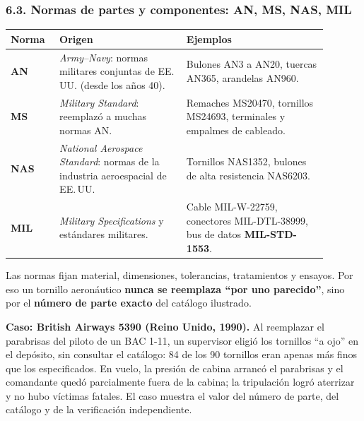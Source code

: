 \subsubsection*{6.3. Normas de partes y componentes: AN, MS, NAS, MIL}
\begin{center}
\small
\begin{tabular}{|p{0.13\linewidth}|p{0.36\linewidth}|p{0.40\linewidth}|}
\hline
\textbf{Norma} & \textbf{Origen} & \textbf{Ejemplos} \\ \hline
\textbf{AN} & \textit{Army--Navy}: normas militares conjuntas de EE.\,UU. (desde los años 40). &
Bulones AN3 a AN20, tuercas AN365, arandelas AN960. \\ \hline
\textbf{MS} & \textit{Military Standard}: reemplazó a muchas normas AN. & Remaches MS20470,
tornillos MS24693, terminales y empalmes de cableado. \\ \hline
\textbf{NAS} & \textit{National Aerospace Standard}: normas de la industria aeroespacial de EE.\,UU.
& Tornillos NAS1352, bulones de alta resistencia NAS6203. \\ \hline
\textbf{MIL} & \textit{Military Specifications} y estándares militares. & Cable MIL-W-22759,
conectores MIL-DTL-38999, bus de datos \textbf{MIL-STD-1553}. \\ \hline
\end{tabular}
\end{center}
Las normas fijan material, dimensiones, tolerancias, tratamientos y ensayos. Por eso un tornillo
aeronáutico \textbf{nunca se reemplaza ``por uno parecido''}, sino por el \textbf{número de parte
exacto} del catálogo ilustrado.

\begin{recuadro}
\textbf{Caso: British Airways 5390 (Reino Unido, 1990).} Al reemplazar el parabrisas del piloto
de un BAC 1-11, un supervisor eligió los tornillos ``a ojo'' en el depósito, sin consultar el
catálogo: 84 de los 90 tornillos eran apenas más finos que los especificados. En vuelo, la presión
de cabina arrancó el parabrisas y el comandante quedó parcialmente fuera de la cabina; la
tripulación logró aterrizar y no hubo víctimas fatales. El caso muestra el valor del número de
parte, del catálogo y de la verificación independiente.
\end{recuadro}

